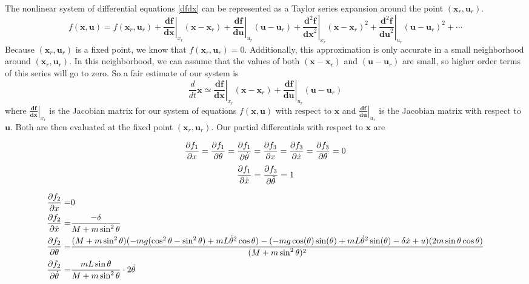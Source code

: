 \documentclass[]{article}
\newcommand{\bx}{\boldsymbol{x}}
\newcommand{\bu}{\boldsymbol{u}}
\begin{document}
The nonlinear system of differential equations \eqref{dfdx} can be represented as a Taylor series expansion around the point $(\bx_r, \bu_r)$.
\begin{equation}
	 f(\bx, \bu) = f(\bx_r, \bu_r) + \left.  \frac{\boldsymbol{df}}{\boldsymbol{dx}} \right|_{x_r}(\bx -\bx_r) 
	 + \left.  \frac{\boldsymbol{df}}{\boldsymbol{du}} \right|_{u_r}(\bu -\bu_r) 
	 + \left. \frac{\boldsymbol{d}^2\boldsymbol{f}}{\boldsymbol{dx}^2} \right|_{x_r}(\bx -\bx_r)^2
	 + \left. \frac{\boldsymbol{d}^2\boldsymbol{f}}{\boldsymbol{du}^2} \right|_{u_r}(\bu -\bu_r)^2 + \cdots
\end{equation}
Because $(\bx_r, \bu_r)$ is a fixed point, we know that $f(\bx_r, \bu_r) = 0$. Additionally, this approximation is only accurate in a small neighborhood around $(\bx_r, \bu_r)$.  In this neighborhood, we can assume that the values of both $(\bx -\bx_r)$ and $(\bu -\bu_r)$ are small, so higher order terms of this series will go to zero. So a fair estimate of our system is
\begin{equation}
	\frac{d}{dt} \bx \simeq \left.  \frac{\boldsymbol{df}}{\boldsymbol{dx}} \right|_{x_r}(\bx -\bx_r) 
	+  \left.  \frac{\boldsymbol{df}}{\boldsymbol{du}} \right|_{u_r}(\bu -\bu_r) 
\end{equation}
where $\left.  \frac{\boldsymbol{df}}{\boldsymbol{dx}} \right|_{x_r}$ is the Jacobian matrix for our system of equations $f(\bx, \bu)$ with respect to $\bx$ and $\left.  \frac{\boldsymbol{df}}{\boldsymbol{du}} \right|_{u_r}$ is the Jacobian matrix with respect to $\bu$. Both are then evaluated at the fixed point $(\bx_r, \bu_r)$.  Our partial differentials with respect to $\bx$ are

\begin{equation*}
	\pdv{f_1}{x}  = \pdv{f_1}{\theta} = \pdv{f_1}{\dot{\theta}} = 	\pdv{f_3}{x}  =	\pdv{f_3}{\dot{x}} = \pdv{f_3}{\theta} = 0 
\end{equation*}
\begin{equation*}
	 \pdv{f_1}{\dot{x}} = \pdv{f_3}{\dot{\theta}}  = 1
\end{equation*}


\begin{eqnarray*}
	\pdv{f_2}{x} = & 0 \\
	\pdv{f_2}{\dot{x}} =&  \frac{-\delta}{M + m \sin^2 \theta} \\
	\pdv{f_2}{\theta} =  & \frac{(M+ m \sin^2 \theta)(-mg(\cos^2 \theta - \sin^2 \theta)+mL\dot{\theta}^2 \cos \theta)-(-mg \cos(\theta)\sin(\theta) + mL{\dot{\theta}}^2 \sin(\theta)-\delta \dot{x}+u)(2m \sin \theta \cos \theta)}{(M + m \sin^2 \theta)^2} \\
	\pdv{f_2}{\dot{\theta}} = & \frac{mL\sin \theta}{M + m \sin^2 \theta} \cdot 2 \dot{\theta}
\end{eqnarray*}
\end{document}
